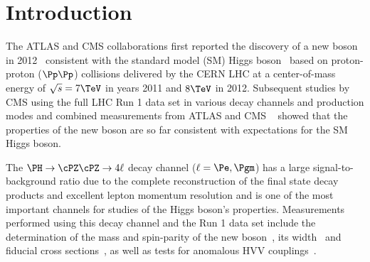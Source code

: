 \section{Introduction}
\label{sec:intro}

The ATLAS and CMS collaborations first reported the discovery of a new boson in 2012~\cite{Chatrchyan:2012ufa,Aad:2012tfa}
consistent with the standard model (SM) Higgs 
boson~\cite{Englert:1964et,Higgs:1964ia,Higgs:1964pj,Guralnik:1964eu,Higgs:1966ev,Kibble:1967sv} 
based on proton-proton ($\Pp\Pp$) collisions delivered by the CERN LHC at a center-of-mass energy of 
$\sqrt{s}=7\TeV$ in years 2011 and $8\TeV$ in 2012. 
Subsequent studies by CMS using the full LHC Run 1 data set in various decay channels and production modes 
and combined measurements from ATLAS and CMS ~\cite{CMS:2014ega, AtlasProperties, Aad:2015zhl, CMS-PAS-HIG-15-002}
showed that the properties of the new boson are so far consistent with expectations for the SM Higgs boson.

The $\HZZfl$ decay channel ($\ell=\Pe,\Pgm$) has a large signal-to-background ratio due to the 
complete reconstruction of the final state decay products and excellent lepton momentum resolution
and is one of the most important channels for studies of the Higgs boson's properties. 
Measurements performed using this decay channel and the Run 1 data set include the determination of 
the mass and spin-parity of the new boson~\cite{CMSH4lLegacy,CMSH4lSpinParity,CMSH4lAnomalousCouplings}, 
its width~\cite{CMSH4lWidth,CMSH4lLifetime} and fiducial cross sections~\cite{CMSH4lFiducial8TeV}, as well as 
tests for anomalous HVV couplings~\cite{CMSH4lAnomalousCouplings,CMSH4lLifetime}. 

